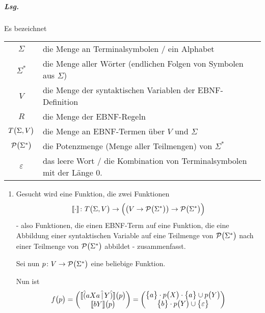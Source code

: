 \documentclass{scrreprt}
\begin{document}
\begin{enumerate}[(a)]
  \subparagraph{Lsg.} Es bezeichnet \\
  \begin{tabular}{cl}
    $\Sigma$
      & die Menge an Terminalsymbolen / ein Alphabet \\
    $\Sigma^*$
      & die Menge aller Wörter (endlichen Folgen von Symbolen aus $\Sigma$) \\
    $V$
      & die Menge der syntaktischen Variablen der EBNF-Definition \\
    $R$
      & die Menge der EBNF-Regeln \\
    $T\qty\big(\Sigma, V)$
      & die Menge an EBNF-Termen über $V$ und $\Sigma$ \\
    $\mathcal{P}\qty\big(\Sigma^*)$
      & die Potenzmenge (Menge aller Teilmengen) von $\Sigma^*$ \\
    $\varepsilon$
      & das leere Wort / die Kombination von Terminalsymbolen mit der Länge 0.
  \end{tabular}
  \begin{enumerate}[(1)]
  \item Gesucht wird eine Funktion, die zwei Funktionen
    \[
      \llbracket\cdot\rrbracket \colon
      T\qty\big(\Sigma, V) \to \qty\Big(
        \qty\big(V \to \mathcal{P}\qty\big(\Sigma^*)) \to
        \mathcal{P}\qty\big(\Sigma^*)
      )
    \]
    - also Funktionen, die einen EBNF-Term auf eine Funktion, die eine
    Abbildung einer syntaktischen Variable auf eine Teilmenge von
    $\mathcal{P}\qty\big(\Sigma^*)$ nach einer Teilmenge von
    $\mathcal{P}\qty\big(\Sigma^*)$ abbildet - zusammenfasst.

    Sei nun $p \colon V \to \mathcal{P}\qty\big(\Sigma^*)$ eine beliebige
    Funktion.

    Nun ist
    \[
      f\qty\big(p) = \begin{pmatrix}
        \llbracket \hat{(}aXa \,\hat{|}\, Y \hat{)} \rrbracket\qty\big(p) \\
        \llbracket bY \rrbracket\qty\big(p)
      \end{pmatrix} = \begin{pmatrix}
        \qty\big{a} \cdot p\qty\big(X) \cdot \qty\big{a} \cup p\qty\big(Y) \\
        \qty\big{b} \cdot p\qty\big(Y) \cup \qty\big{\varepsilon}
      \end{pmatrix}
    \]


\end{enumerate}
\end{enumerate}
\end{document}
